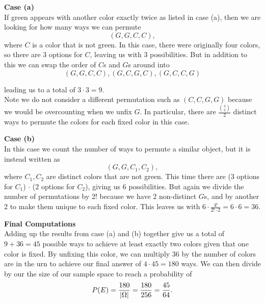 \documentclass{exam}
\begin{document}
\begin{questions}

\newline

\textbf{Case (a) \\}
If green appears with another color exactly twice as listed in case (a), then we are looking for how many ways we can permute
$$(G, G, C, C),$$
where $C$ is a color that is not green. In this case, there were originally four colors, so there are 3 options for $C$, leaving us with 3 possibilities. But in addition to this we can swap the order of $C$s and $G$s around into
$$(G, G, C, C), (G, C, G, C), (G, C, C, G)$$

leading us to a total of $3 \cdot 3 = 9$. \\
Note we do not consider a different permutation such as $(C, C, G, G)$ because we would be overcounting when we unfix $G$. In particular, there are $\frac{\binom{4}{2}}{2}$ distinct ways to permute the colors for each fixed color in this case.
 
\newline

\textbf{Case (b) \\}
In this case we count the number of ways to permute a similar object, but it is instead written as
$$(G, G, C_1, C_2),$$
where $C_1, C_2$ are distinct colors that are not green. This time there are (3 options for $C_1$) $\cdot$ (2 options for $C_2$), giving us 6 possibilities. But again we divide the number of permutations by 2! because we have 2 non-distinct $G$s, and by another 2 to make them unique to each fixed color. This leaves us with $6 \cdot \frac{4!}{2! \cdot 2} = 6 \cdot 6 = 36$.

\newline

\textbf{Final Computations \\}
Adding up the results from case (a) and (b) together give us a total of $9 + 36 = 45$ possible ways to achieve at least exactly two colors given that one color is fixed. By unfixing this color, we can multiply 36 by the number of colors are in the urn to achieve our final answer of $4 \cdot 45 = 180$ ways. We can then divide by our the size of our sample space to reach a probability of
$$P(E) = \frac{180}{\left| \Omega \right|} = \frac{180}{256} = \frac{45}{64}.$$





\newpage
\end{questions}
\end{document}
